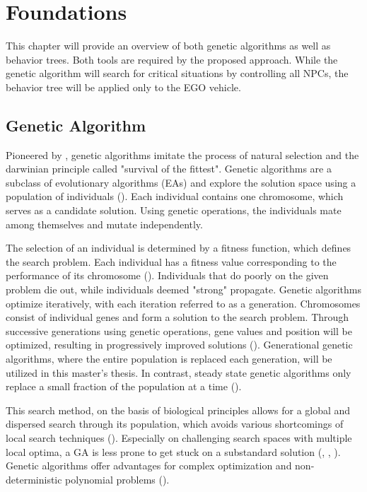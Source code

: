 \chapter{Foundations}
\label{chap:foundations}
This chapter will provide an overview of both genetic algorithms as well as behavior trees. Both tools are required by the proposed approach. While the genetic algorithm will search for critical situations by controlling all NPCs, the behavior tree will be applied only to the EGO vehicle.

\section{Genetic Algorithm}
\label{sect:foundations:genetic_algorithm}
Pioneered by \cite{holland_adaptation_1992}, genetic algorithms imitate the process of natural selection and the darwinian principle called "survival of the fittest". Genetic algorithms are a subclass of evolutionary algorithms (EAs) and explore the solution space using a population of individuals (\cite{mills_determining_2015}). Each individual contains one chromosome, which serves as a candidate solution. Using genetic operations, the individuals mate among themselves and mutate independently. 

The selection of an individual is determined by a fitness function, which defines the search problem. Each individual has a fitness value corresponding to the performance of its chromosome (\cite{majumdar_genetic_2015}). Individuals that do poorly on the given problem die out, while individuals deemed "strong" propagate. Genetic algorithms optimize iteratively, with each iteration referred to as a generation. Chromosomes consist of individual genes and form a solution to the search problem. Through successive generations using genetic operations, gene values and position will be optimized, resulting in progressively improved solutions (\cite{srinivas_genetic_1994}). Generational genetic algorithms, where the entire population is replaced each generation, will be utilized in this master's thesis. In contrast, steady state genetic algorithms only replace a small fraction of the population at a time (\cite{srinivas_genetic_1994}).

This search method, on the basis of biological principles allows for a global and dispersed search through its population, which avoids various shortcomings of local search techniques (\cite{grefenstette_optimization_1986}). Especially on challenging search spaces with multiple local optima, a GA is less prone to get stuck on a substandard solution (\cite{katoch_review_2021}, \cite{xia_genetic_2019}, \cite{majumdar_genetic_2015}). Genetic algorithms offer advantages for complex optimization and non-deterministic polynomial problems (\cite{hussain_trade-off_2020}).

